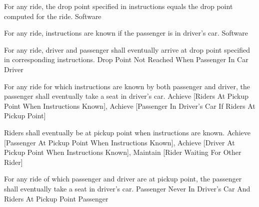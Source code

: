   \startkaosspec
  	 {For any ride, the drop point specified in instructions equals the drop point computed for the ride.}
  	 {Software}
  \stopkaosspec
  
  \startkaosspec
  	 {For any ride, instructions are known if the passenger is in driver’s car.}
  	 {Software}
  \stopkaosspec
  
  \startkaosspec
  	 {For any ride, driver and passenger shall eventually arrive at drop point specified in corresponding instructions.}
  	 {Drop Point Not Reached When Passenger In Car}
  	 {Driver}
  \stopkaosspec
  

    {}

  
  \startkaosspec
  	 {For any ride for which instructions are known by both passenger and driver, the passenger shall eventually take a seat in driver’s car.}
  	 {Achieve [Riders At Pickup Point When Instructions Known], Achieve [Passenger In Driver's Car If Riders At Pickup Point]}
  \stopkaosspec

  \startkaosspec
  	 {Riders shall eventually be at pickup point when instructions are known.}
  	 {Achieve [Passenger At Pickup Point When Instructions Known], Achieve [Driver At Pickup Point When Instructions Known], Maintain [Rider Waiting For Other Rider]}
  \stopkaosspec

  \startkaosspec
  	 {For any ride of which passenger and driver are at pickup point, the passenger shall eventually take a seat in driver’s car.}
  	 {Passenger Never In Driver’s Car And Riders At Pickup Point}
  	 {Passenger}
  \stopkaosspec

